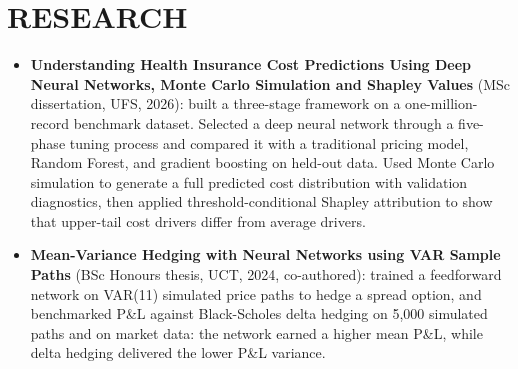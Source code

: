 \documentclass[letterpaper,11pt]{article}
\newcommand{\resumeItem}[1]{
  \item\small{
    {#1 \vspace{-1pt}}
  }
}
\newcommand{\resumeItemListStart}{\begin{itemize}[leftmargin=0.1in]}
\newcommand{\resumeItemListEnd}{\end{itemize}\vspace{-5pt}}
\begin{document}
\section{RESEARCH}
\vspace{4pt}
\resumeItemListStart
    \resumeItem{\small{\textbf{Understanding Health Insurance Cost Predictions Using Deep Neural Networks, Monte Carlo Simulation and Shapley Values} (MSc dissertation, UFS, 2026): built a three-stage framework on a one-million-record benchmark dataset. Selected a deep neural network through a five-phase tuning process and compared it with a traditional pricing model, Random Forest, and gradient boosting on held-out data. Used Monte Carlo simulation to generate a full predicted cost distribution with validation diagnostics, then applied threshold-conditional Shapley attribution to show that upper-tail cost drivers differ from average drivers.}}
    \vspace{2pt}
    \resumeItem{\small{\textbf{Mean-Variance Hedging with Neural Networks using VAR Sample Paths} (BSc Honours thesis, UCT, 2024, co-authored): trained a feedforward network on VAR(11) simulated price paths to hedge a spread option, and benchmarked P\&L against Black-Scholes delta hedging on 5,000 simulated paths and on market data: the network earned a higher mean P\&L, while delta hedging delivered the lower P\&L variance.}}
\resumeItemListEnd
\vspace{-4pt}

\end{document}
